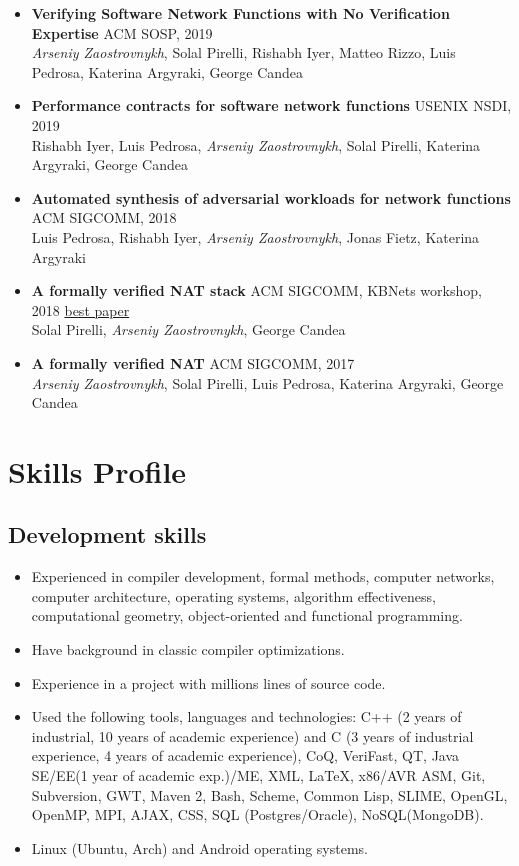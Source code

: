 \documentclass[letterpaper]{resume}
\begin{document}
\begin{itemize}
\item \textbf{Verifying Software Network Functions with No Verification Expertise} {ACM SOSP, 2019}\\
  \emph{Arseniy Zaostrovnykh}, Solal Pirelli, Rishabh Iyer, Matteo Rizzo, Luis Pedrosa, Katerina Argyraki, George Candea
\item \textbf{Performance contracts for software network functions} {USENIX NSDI, 2019} \\
  Rishabh Iyer, Luis Pedrosa, \emph{Arseniy Zaostrovnykh}, Solal Pirelli, Katerina Argyraki, George Candea
\item \textbf{Automated synthesis of adversarial workloads for network
    functions} {ACM SIGCOMM, 2018}\\
  Luis Pedrosa, Rishabh Iyer, \emph{Arseniy Zaostrovnykh}, Jonas Fietz, Katerina Argyraki
\item \textbf{A formally verified NAT stack} {ACM SIGCOMM, KBNets workshop, 2018}
  \underline{best paper} \\
  Solal Pirelli, \emph{Arseniy Zaostrovnykh}, George Candea
\item \textbf{A formally verified NAT} {ACM SIGCOMM, 2017}\\
  \emph{Arseniy Zaostrovnykh}, Solal Pirelli, Luis Pedrosa, Katerina Argyraki, George Candea

\end{itemize}

\section{Skills Profile}
\subsection{Development skills}
\begin{itemize}
    \item Experienced in compiler development, formal methods, computer networks, computer architecture, operating systems, algorithm effectiveness, computational geometry, object-oriented and functional programming.
    \item Have background in classic compiler optimizations.
    \item Experience in a project with millions lines of source code.
    \item Used the following tools, languages and technologies: C++ (2 years of
      industrial, 10 years of academic experience) and C (3 years of industrial
      experience, 4 years of academic experience), CoQ, VeriFast, QT, Java SE/EE(1 year of academic exp.)/ME, XML, \LaTeX, x86/AVR ASM, Git, Subversion, GWT, Maven 2, Bash, Scheme, Common Lisp, SLIME, OpenGL, OpenMP, MPI, AJAX, CSS, SQL (Postgres/Oracle), NoSQL(MongoDB).
    \item Linux (Ubuntu, Arch) and Android operating systems.
\end{itemize}
\end{document}
